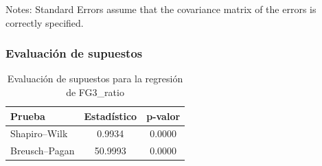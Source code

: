 Notes: \newline
 [1] Standard Errors assume that the covariance matrix of the errors is correctly specified.
\subsubsection{Evaluación de supuestos}
\begin{table}[H]
\centering
\begin{tabular}{lcc}
\toprule
Prueba & Estadístico & p-valor \\
\midrule
Shapiro--Wilk & 0.9934 & 0.0000 \\
Breusch--Pagan & 50.9993 & 0.0000 \\
\bottomrule
\end{tabular}
\caption{Evaluación de supuestos para la regresión de FG3_ratio}
\end{table}
